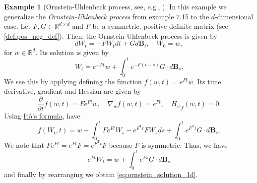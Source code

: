 \documentclass[12pt]{article}
\theoremstyle{definition}
\newtheorem{example}[example]{Example}
\numberwithin{equation}{section}
\newcommand{\R}{\mathbb{R}}
\newcommand{\T}{\mathsf{T}}
\begin{document}
\begin{example}[Ornstein-Uhlenbeck process, see, e.g., ]
  \label{ex:ornstein_uhlenbeck}
  In this example we generalize the \emph{Ornstein-Uhlenbeck process} from example 7.15 \cite[pp.~152]{eAppliedStochasticAnalysis2021} to the $d$-dimensional case.
  Let $F, G \in \R^{d \times d}$ and $F$ be a symmetric, positive definite matrix (see \autoref{def:pos_neg_def}). Then, the Ornstein-Uhlenbeck process is given by
  \begin{equation*}
    dW_t = -F W_t dt + G d\mathbf{B}_t, \quad W_0 = w,
  \end{equation*}
  for $w \in \R^d$.
  Its solution is given by 
  \begin{equation}
    \label{eq:ornstein_solution_1d}
    W_t = e^{-F t}w + \int_0^t e^{-F (t - s)}G \cdot d\mathbf{B}_s.
  \end{equation}
  We see this by applying defining the function $f(w,t) = e^{F t}w$. Its time derivative, gradient and Hessian are given by
  \begin{equation*}
    \frac{\partial}{\partial t} f(w,t) = F e^{F t}w, \quad \nabla_w f(w,t) = e^{F t}, \quad {H_w}_f(w,t) = 0.
  \end{equation*}
  Using \hyperref[thm:ito_formula]{Itô's formula}, have 
  \begin{equation*}
      f(W_t, t) = w + \int_0^t F e^{F t}W_s - e^{F^\T t} FW_sds + \int_0^t e^{F^\T t} G \cdot d\mathbf{B}_s.
  \end{equation*}
  We note that $Fe^{Ft} = e^{Ft}F = e^{F^\T t}F$ because $F$ is symmetric.
  Thus, we have 
  \begin{equation*}
    e^{F t}W_t = w + \int_0^t e^{F s} G \cdot d\mathbf{B}_s
  \end{equation*}
  and finally by rearranging we obtain \eqref{eq:ornstein_solution_1d}.
\end{example}
\end{document}
